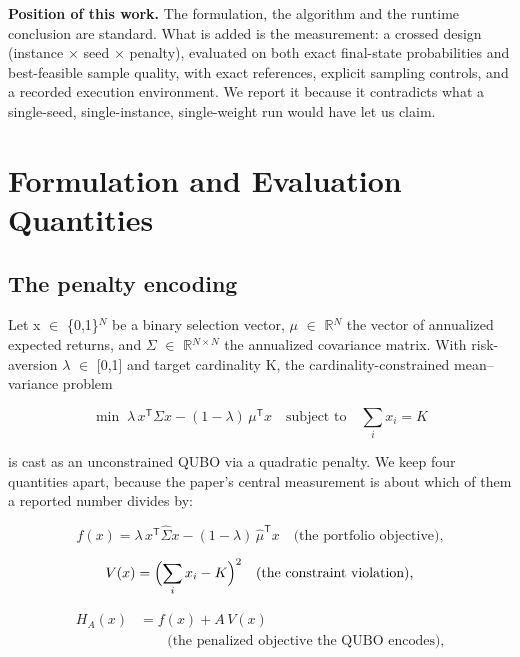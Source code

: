 \documentclass{ieeeaccess}
\begin{document}
\textbf{Position of this work.} The formulation, the algorithm and the runtime conclusion are standard. What is added is the measurement: a crossed design (instance $\times$ seed $\times$ penalty), evaluated on both exact final-state probabilities and best-feasible sample quality, with exact references, explicit sampling controls, and a recorded execution environment. We report it because it contradicts what a single-seed, single-instance, single-weight run would have let us claim.


\section{Formulation and Evaluation Quantities}


\subsection{The penalty encoding}


Let x $\in$ \{0,1\}$^{N}$ be a binary selection vector, $\mu$ $\in$ $\mathbb{R}$$^{N}$ the vector of annualized expected returns, and $\Sigma$ $\in$ $\mathbb{R}$$^{N\times N}$ the annualized covariance matrix. With risk-aversion $\lambda$ $\in$ [0,1] and target cardinality K, the cardinality-constrained mean--variance problem


\begin{equation*}
\min\; \lambda\, x^{\mathsf{T}}\Sigma x - (1-\lambda)\, \mu^{\mathsf{T}}x\quad \text{subject to}\quad \sum_i x_i = K
\end{equation*}


is cast as an unconstrained QUBO via a quadratic penalty. We keep four quantities apart, because the paper's central measurement is about which of them a reported number divides by:


\begin{equation*}
f(x) = \lambda\, x^{\mathsf{T}}\hat{\Sigma} x - (1-\lambda)\, \hat{\mu}^{\mathsf{T}}x\quad\text{(the portfolio objective),}
\end{equation*}


\begin{equation*}
V(x) = \Bigl(\sum_i x_i - K\Bigr)^2\quad\text{(the constraint violation),}
\end{equation*}


\begin{equation*}
\begin{aligned} H_A(x) &= f(x) + A\, V(x) \\ &\qquad\text{(the penalized objective the QUBO encodes),}\end{aligned}
\end{equation*}
\end{document}
